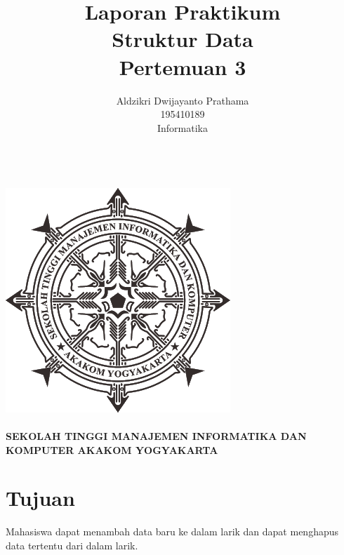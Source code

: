\documentclass[a4paper,12pt]{article}
\begin{document}
\title{ {\Large Laporan Praktikum}\\ Struktur Data\\{\Large Pertemuan 3}}

\author{Aldzikri Dwijayanto Prathama
    \\195410189
    \\Informatika}
\makeatletter
\begin{titlepage}
    \begin{center}
        {\huge \bfseries \@title}\\[14ex]
        \includegraphics[scale=.8]{logo}\\[4ex]
        {\large \@author}\\[12ex]
        {\large \bfseries {SEKOLAH TINGGI MANAJEMEN INFORMATIKA DAN KOMPUTER
            AKAKOM YOGYAKARTA}}
    \end{center}


\end{titlepage}
\makeatother
\newpage
\tableofcontents
\newpage

\section{Tujuan}
Mahasiswa dapat menambah data baru ke dalam larik dan dapat menghapus data tertentu dari dalam larik.
\end{document}
